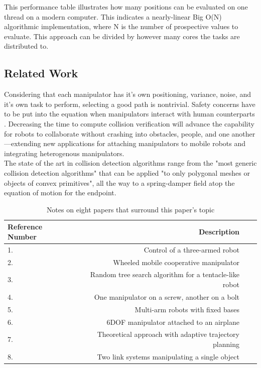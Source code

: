 \documentclass[9pt,twocolumn,twoside]{pnas-new}
\begin{document}
This performance table illustrates how many positions can be evaluated on one thread on a modern computer. This indicates a nearly-linear Big O(N) algorithmic implementation, where N is the number of prospective values to evaluate. This approach can be divided by however many cores the tasks are distributed to.




\subsection*{Related Work}
Considering that each manipulator has it's own positioning, variance, noise, and it's own task to perform, selecting a good path is nontrivial. Safety concerns have to be put into the equation when manipulators interact with human counterparts \cite{Jung2014}. Decreasing the time to compute collision verification will advance the capability for robots to collaborate without crashing into obstacles, people, and one another---extending new applications for attaching manipulators to mobile robots and integrating heterogenous manipulators.
\\
The state of the art in collision detection algorithms range from the "most generic collision detection algorithms" that can be applied "to only polygonal meshes or objects of convex primitives"\cite{Li:2012bn}, all the way to a spring-damper field atop the equation of motion for the endpoint\cite{Stadlbauer:2008ky}. 
\\
\begin{table}%

\caption{Notes on eight papers that surround this paper's topic} \label{tab:a}
\begin{tabular}{lrrr}
\centering
Reference Number & Description \\
\midrule
1. \cite{sunada1994coordinated} & Control of a three-armed robot \\
2. \cite{korayem2016sdre} & Wheeled mobile cooperative manipulator \\
3. \cite{sun2016safe} & Random tree search algorithm for a tentacle-like robot \\
4. \cite{hsu1993coordinated} & One manipulator on a screw, another on a bolt \\
5. \cite{khatib1996vehicle} & Multi-arm robots with fixed bases \\
6. \cite{baizid2016behavioral} & 6DOF manipulator attached to an airplane \\
7. \cite{hsu1993adaptive} & Theoretical approach with adaptive trajectory planning \\
8. \cite{liu1999cooperation} & Two link systems manipulating a single object \\

\bottomrule
\end{tabular}
\end{table}
\end{document}
